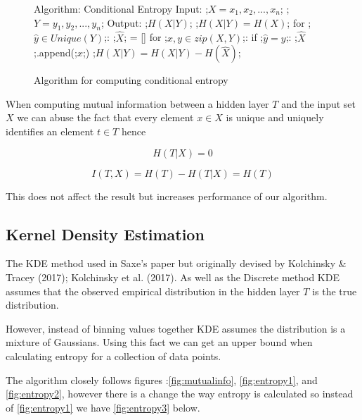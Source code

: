 \begin{figure}[H]
    \begin{pythonfigure}
      Algorithm: Conditional Entropy
      Input: 
      ;$X = x_1, x_2,...,x_n$;
      ;$Y = y_1, y_2,...,y_n$;
      Output: ;$H(X|Y)$;
      ;$H(X|Y) = H(X)$;
      for ;$ \hat{y}\in Unique(Y)$;:
        ;$\hat{X}$; = []
        for ;$x, y \in zip(X, Y)$;:
          if ;$\hat{y} = y$;:
            ;$\hat{X}$;.append(;$x$;)
          ;$H(X|Y) = H(X|Y) - H(\hat{X})$;
    \end{pythonfigure}
    \caption{Algorithm for computing conditional entropy}
    \label{fig:entropy2}
\end{figure}

When computing mutual information between a hidden layer $T$ and the input set
$X$ we can abuse the fact that every element $x\in X$ is unique and uniquely
identifies an element $t\in T$ hence 

\begin{equation}
  H(T|X) = 0 
\end{equation}

\begin{equation}
  I(T, X) = H(T) - H(T|X) = H(T) 
\end{equation}

This does not affect the result but increases performance of our algorithm.

\subsection{Kernel Density Estimation}

  The KDE method used in Saxe's paper but originally devised by Kolchinsky \&
  Tracey (2017); Kolchinsky et al. (2017). As well as the Discrete method KDE
  assumes that the observed empirical distribution in the hidden layer $T$ is
  the true distribution. 

  However, instead of binning values together KDE assumes the distribution is a
  mixture of Gaussians. Using this fact we can get an upper bound when
  calculating entropy for a collection of data points.

  The algorithm closely follows figures :\autoref{fig:mutualinfo},
  \autoref{fig:entropy1}, and \autoref{fig:entropy2}, however there is a change
  the way entropy is calculated so instead of \autoref{fig:entropy1} we have
  \autoref{fig:entropy3} below.

